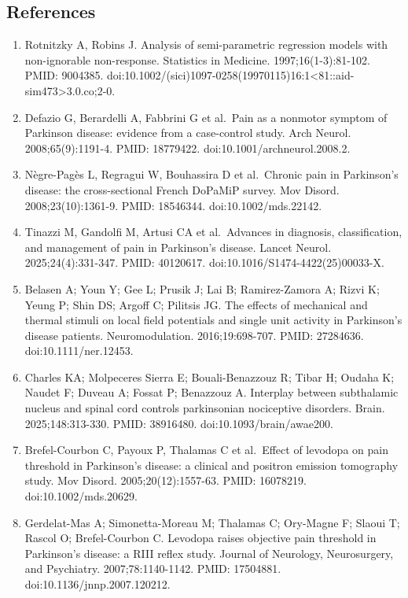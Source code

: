 \documentclass[
  english,
  12pt,
]{article}
\begin{document}
\subsection{References}\label{references}

\begin{enumerate}
\def\labelenumi{\arabic{enumi}.}
\item
  Rotnitzky A, Robins J. Analysis of semi-parametric regression models with non-ignorable non-response. Statistics in Medicine. 1997;16(1-3):81-102. PMID: 9004385. doi:10.1002/(sici)1097-0258(19970115)16:1\textless81::aid-sim473\textgreater3.0.co;2-0.
\item
  Defazio G, Berardelli A, Fabbrini G et al.~Pain as a nonmotor symptom of Parkinson disease: evidence from a case-control study. Arch Neurol. 2008;65(9):1191-4. PMID: 18779422. doi:10.1001/archneurol.2008.2.
\item
  Nègre-Pagès L, Regragui W, Bouhassira D et al.~Chronic pain in Parkinson's disease: the cross-sectional French DoPaMiP survey. Mov Disord. 2008;23(10):1361-9. PMID: 18546344. doi:10.1002/mds.22142.
\item
  Tinazzi M, Gandolfi M, Artusi CA et al.~Advances in diagnosis, classification, and management of pain in Parkinson's disease. Lancet Neurol. 2025;24(4):331-347. PMID: 40120617. doi:10.1016/S1474-4422(25)00033-X.
\item
  Belasen A; Youn Y; Gee L; Prusik J; Lai B; Ramirez-Zamora A; Rizvi K; Yeung P; Shin DS; Argoff C; Pilitsis JG. The effects of mechanical and thermal stimuli on local field potentials and single unit activity in Parkinson's disease patients. Neuromodulation. 2016;19:698-707. PMID: 27284636. doi:10.1111/ner.12453.
\item
  Charles KA; Molpeceres Sierra E; Bouali-Benazzouz R; Tibar H; Oudaha K; Naudet F; Duveau A; Fossat P; Benazzouz A. Interplay between subthalamic nucleus and spinal cord controls parkinsonian nociceptive disorders. Brain. 2025;148:313-330. PMID: 38916480. doi:10.1093/brain/awae200.
\item
  Brefel-Courbon C, Payoux P, Thalamas C et al.~Effect of levodopa on pain threshold in Parkinson's disease: a clinical and positron emission tomography study. Mov Disord. 2005;20(12):1557-63. PMID: 16078219. doi:10.1002/mds.20629.
\item
  Gerdelat-Mas A; Simonetta-Moreau M; Thalamas C; Ory-Magne F; Slaoui T; Rascol O; Brefel-Courbon C. Levodopa raises objective pain threshold in Parkinson's disease: a RIII reflex study. Journal of Neurology, Neurosurgery, and Psychiatry. 2007;78:1140-1142. PMID: 17504881. doi:10.1136/jnnp.2007.120212.

\end{enumerate}
\end{document}
